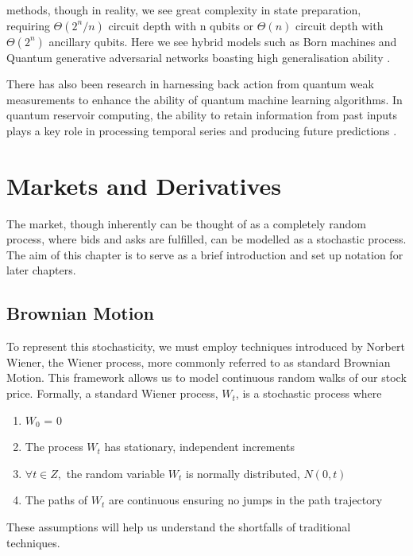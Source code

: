 \documentclass[12pt]{article}
\newcommand{\newp}
    {
    \vskip 0.5cm 
  }
\numberwithin{equation}{section}
\begin{document}
methods, though in reality, we see great complexity in state preparation, requiring 
$\Theta(2^n/n)$ circuit depth with n qubits or $\Theta(n)$ circuit depth with 
$\Theta(2^n)$ ancillary qubits\autocite{zhang_quantum_2022}. Here we see hybrid 
models such as Born machines
and Quantum generative adversarial networks boasting high generalisation ability
\autocite{ganguly_implementing_nodate,gili_2022_do,horowitz_quantum_2022}.
\newp
There has also been research in harnessing back action from quantum weak 
measurements to enhance the ability of quantum machine learning algorithms. 
In quantum reservoir computing,
the ability to retain information from past inputs plays a key role in processing 
temporal series and producing future predictions
\autocite{franceschetto_harnessing_2024,fujii_quantum_2020,garcia-beni_squeezing_2024,mujal_time-series_2023}.
\newpage
\section{Markets and Derivatives}
The market, though inherently can be thought of as a completely random process,
where bids and asks are fulfilled, can be modelled as a stochastic process. The 
aim of this chapter is to serve as a brief introduction and set up notation for 
later chapters. 

\subsection{Brownian Motion}
To represent this stochasticity, we must employ techniques introduced by Norbert 
Wiener, the Wiener process, more commonly referred to as standard Brownian Motion. 
This framework allows us to model continuous random 
walks of our stock price. Formally, a standard Wiener process, $W_t$, is a stochastic 
process where 
\begin{enumerate}
  \item $W_0$ = 0
  \item The process $W_t$ has stationary, independent increments
  \item $\forall t \in Z,$ the random variable $W_t$ is normally distributed, $N(0,t)$ 
  \item The paths of $W_t$ are continuous ensuring no jumps in the path trajectory
\end{enumerate}
These assumptions will help us understand the shortfalls of traditional techniques.
\end{document}
